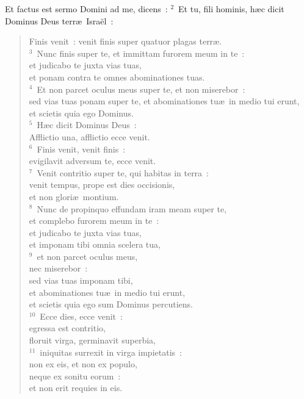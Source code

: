 \bchapter
\lettrine[lines=3,image=true,loversize=0.05,lraise=-0.03]{E}{}t factus est sermo Domini ad me, dicens~:
${}^{2}$~Et tu, fili hominis, h\ae c dicit Dominus Deus terr\ae\ Isra\"el~: \begin{flushleft}\begin{verse}Finis venit~: venit finis super quatuor plagas terr\ae .\\
${}^{3}$~Nunc finis super te, et immittam furorem meum in te~:\\ et judicabo te juxta vias tuas,\\ et ponam contra te omnes abominationes tuas.\\
${}^{4}$~Et non parcet oculus meus super te, et non miserebor~:\\ sed vias tuas ponam super te, et abominationes tu\ae\ in medio tui erunt,\\ et scietis quia ego Dominus.\\
${}^{5}$~H\ae c dicit Dominus Deus~:\\ Afflictio una, afflictio ecce venit.\\
${}^{6}$~Finis venit, venit finis~:\\ evigilavit adversum te, ecce venit.\\
${}^{7}$~Venit contritio super te, qui habitas in terra~:\\ venit tempus, prope est dies occisionis,\\ et non glori\ae\ montium.\\
${}^{8}$~Nunc de propinquo effundam iram meam super te,\\ et complebo furorem meum in te~:\\ et judicabo te juxta vias tuas,\\ et imponam tibi omnia scelera tua,\\
${}^{9}$~et non parcet oculus meus,\\ nec miserebor~:\\ sed vias tuas imponam tibi,\\ et abominationes tu\ae\ in medio tui erunt,\\ et scietis quia ego sum Dominus percutiens.\\
${}^{10}$~Ecce dies, ecce venit~:\\ egressa est contritio,\\ floruit virga, germinavit superbia,\\
${}^{11}$~iniquitas surrexit in virga impietatis~:\\ non ex eis, et non ex populo,\\ neque ex sonitu eorum~:\\ et non erit requies in eis.\\

\end{verse}
\end{flushleft}
